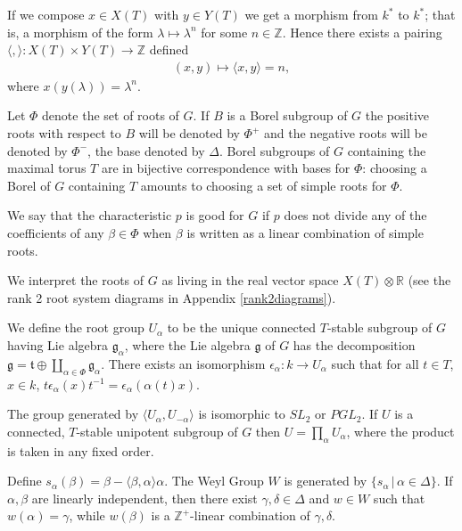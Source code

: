 If we compose $x\in X(T)$ with $y\in Y(T)$ we get a morphism from $k^*$ to $k^*$; that is, a morphism of the form $\lambda\mapsto \lambda^n$ for some $n\in \mathbb{Z}$. Hence there exists a pairing $\langle,\rangle:X(T)\times Y(T)\rightarrow \mathbb{Z}$ defined
\begin{align*}
	(x, y) \mapsto \langle x, y\rangle = n,
\end{align*}
where $x(y(\lambda)) = \lambda^n$. 

Let $\Phi$ denote the set of roots of $G$. If $B$ is a Borel subgroup of $G$ the positive roots with respect to $B$ will be denoted by $\Phi^+$ and the negative roots will be denoted by $\Phi^-$, the base denoted by $\Delta$. Borel subgroups of $G$ containing the maximal torus $T$ are in bijective correspondence with bases for $\Phi$: choosing a Borel of $G$ containing $T$ amounts to choosing a set of simple roots for $\Phi$.

We say that the characteristic $p$ is good for $G$ if $p$ does not divide any of the coefficients of any $\beta\in\Phi$ when $\beta$ is written as a linear combination of simple roots.

We interpret the roots of $G$ as living in the real vector space $X(T)\otimes \mathbb{R}$ (see the rank 2 root system diagrams in Appendix \ref{rank2diagrams}).

We define the root group $U_\alpha$ to be the unique connected $T$-stable subgroup of $G$ having Lie algebra $\mathfrak{g}_\alpha$, where the Lie algebra $\mathfrak{g}$ of $G$ has the decomposition $\mathfrak{g} = \mathfrak{t} \oplus \coprod_{\alpha\in\Phi} \mathfrak{g}_\alpha$. There exists an isomorphism $\epsilon_\alpha: k \rightarrow U_\alpha$ such that for all $t\in T$, $x\in k$, $t\epsilon_\alpha(x)t^{-1} = \epsilon_\alpha(\alpha(t)x)$.

The group generated by $\langle U_\alpha, U_{-\alpha}\rangle$ is isomorphic to $SL_2$ or $PGL_2$. If $U$ is a connected, $T$-stable unipotent subgroup of $G$ then $U=\prod_\alpha U_\alpha$, where the product is taken in any fixed order.

Define $s_\alpha(\beta)= \beta -\langle \beta,\alpha\rangle\alpha$. The Weyl Group $W$ is generated by $\{s_\alpha\,|\,\alpha\in \Delta\}$. If $\alpha,\beta$ are linearly independent, then there exist $\gamma,\delta\in \Delta$ and $w\in W$ such that $w(\alpha) = \gamma$, while $w(\beta)$ is a $\mathbb{Z}^+$-linear combination of $\gamma, \delta$.

